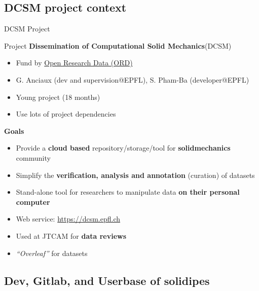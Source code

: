 \documentclass[10pt,compress,serif,aspectratio=169]{beamer}
\begin{document}
\subsection{DCSM project context}
\begin{frame}{DCSM Project}

Project \textbf{Dissemination of Computational Solid Mechanics}(DCSM)\\
\begin{itemize}
  \item Fund by \href{https://ethrat.ch/en/eth-domain/open-research-data/}{Open Research Data (ORD)}
  \item G. Anciaux (dev and supervision@EPFL), S. Pham-Ba (developer@EPFL)
  \item Young project (18 months)
  \item Use lots of project dependencies  
\end{itemize}
\vfill
\textbf{Goals}
\begin{itemize}
  \item Provide a \textbf{cloud based} repository/storage/tool for \textbf{solidmechanics} community
  \item Simplify the \textbf{verification, analysis and annotation} (curation) of datasets
  \item Stand-alone tool for researchers to manipulate data \textbf{on their personal computer}
  \item Web service: \url{https://dcsm.epfl.ch}
  \item Used at JTCAM for \textbf{data reviews}
  \item \textit{``Overleaf''} for datasets
\end{itemize}
\end{frame}

\subsection{Dev, Gitlab, and Userbase of solidipes}
\begin{frame}[t]
\end{frame}


\end{document}
